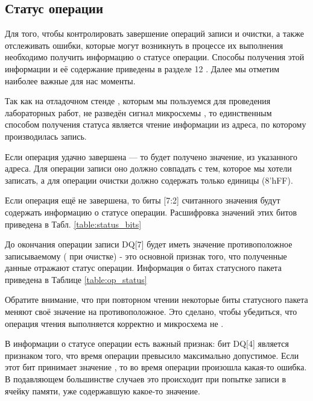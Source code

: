 \subsection{Статус операции}
\par{Для того, чтобы контролировать завершение операций записи и очистки, а также отслеживать ошибки, которые могут возникнуть в процессе их выполнения необходимо получить информацию о статусе операции. Способы получения этой информации и её содержание приведены в разделе 12 . Далее мы отметим наиболее важные для нас моменты.}
\par{Так как на отладочном стенде , которым мы пользуемся для проведения лабораторных работ, не разведён сигнал  микросхемы , то единственным способом получения статуса является чтение информации из адреса, по которому производилась запись.}
\par{Если операция удачно завершена --- то будет получено значение, из указанного адреса. Для операции записи оно должно совпадать с тем, которое мы хотели записать, а для операции очистки должно содержать только единицы (8'hFF).}
\par{Если операция ещё не завершена, то биты [7:2] считанного значения будут содержать информацию о статусе операции. Расшифровка значений этих битов приведена в Табл. \ref{table:status_bits}}
\par{До окончания операции записи DQ[7] будет иметь значение противоположное записываемому ( при очистке) - это основной признак того, что полученные данные отражают статус операции. Информация о битах статусного пакета приведена в Таблице \ref{table:op_status}}
\par{Обратите внимание, что при повторном чтении некоторые биты статусного пакета меняют своё значение на противоположное. Это сделано, чтобы убедиться, что операция чтения выполняется корректно и микросхема не .}
\par{В информации о статусе операции есть важный признак: бит DQ[4] является признаком того, что время операции превысило максимально допустимое. Если этот бит принимает значение , то во время операции произошла какая-то ошибка. В подавляющем большинстве случаев это происходит при попытке записи в ячейку памяти, уже содержавшую какое-то значение.}

